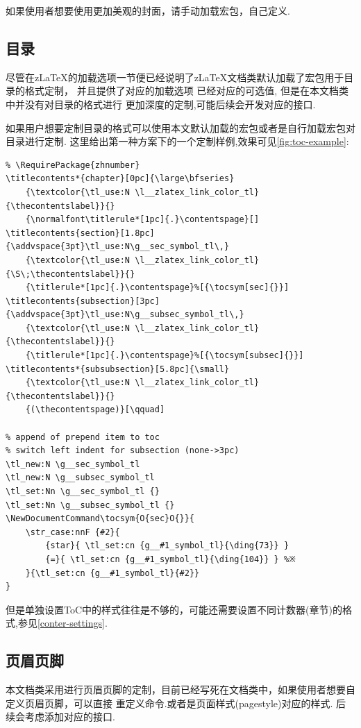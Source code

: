 如果使用者想要使用更加美观的封面，请手动加载宏包，自己定义.

\subsection{目录}
尽管在z\LaTeX{}的加载选项一节便已经说明了z\LaTeX{}文档类默认加载了宏包用于目录的格式定制，
并且提供了对应的加载选项 已经对应的可选值, 但是在本文档类中并没有对目录的格式进行
更加深度的定制,可能后续会开发对应的接口. 

如果用户想要定制目录的格式可以使用本文默认加载的宏包或者是自行加载宏包对目录进行定制.
这里给出第一种方案下的一个定制样例,效果可见\cref{fig:toc-example}:
\begin{verbatim}
% \RequirePackage{zhnumber}
\titlecontents*{chapter}[0pc]{\large\bfseries}
    {\textcolor{\tl_use:N \l__zlatex_link_color_tl}{\thecontentslabel}}{}
    {\normalfont\titlerule*[1pc]{.}\contentspage}[]
\titlecontents{section}[1.8pc]{\addvspace{3pt}\tl_use:N\g__sec_symbol_tl\,}
    {\textcolor{\tl_use:N \l__zlatex_link_color_tl}{\S\;\thecontentslabel}}{}
    {\titlerule*[1pc]{.}\contentspage}%[{\tocsym[sec]{}}]
\titlecontents{subsection}[3pc]{\addvspace{3pt}\tl_use:N\g__subsec_symbol_tl\,}
    {\textcolor{\tl_use:N \l__zlatex_link_color_tl}{\thecontentslabel}}{}
    {\titlerule*[1pc]{.}\contentspage}%[{\tocsym[subsec]{}}]
\titlecontents*{subsubsection}[5.8pc]{\small}
    {\textcolor{\tl_use:N \l__zlatex_link_color_tl}{\thecontentslabel}}{}
    {(\thecontentspage)}[\qquad]

% append of prepend item to toc
% switch left indent for subsection (none->3pc)
\tl_new:N \g__sec_symbol_tl
\tl_new:N \g__subsec_symbol_tl
\tl_set:Nn \g__sec_symbol_tl {}
\tl_set:Nn \g__subsec_symbol_tl {}
\NewDocumentCommand\tocsym{O{sec}O{}}{
    \str_case:nnF {#2}{
        {star}{ \tl_set:cn {g__#1_symbol_tl}{\ding{73}} }
        {=}{ \tl_set:cn {g__#1_symbol_tl}{\ding{104}} } %※
    }{\tl_set:cn {g__#1_symbol_tl}{#2}}
} 
\end{verbatim}

但是单独设置ToC中的样式往往是不够的，可能还需要设置不同计数器(章节)的格式,参见\cref{conter-settings}.

\subsection{页眉页脚}
本文档类采用进行页眉页脚的定制，目前已经写死在文档类中，如果使用者想要自定义页眉页脚，可以直接
重定义\cmd{\fancyhead, \fancyfoot}命令.或者是页面样式(pagestyle)对应的样式. 后续会考虑添加对应的接口.

